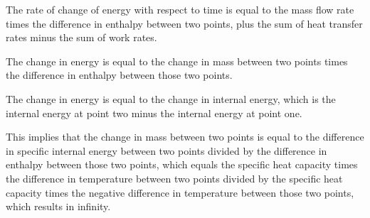 The rate of change of energy with respect to time is equal to the mass flow rate times the difference in enthalpy between two points, plus the sum of heat transfer rates minus the sum of work rates.

The change in energy is equal to the change in mass between two points times the difference in enthalpy between those two points.

The change in energy is equal to the change in internal energy, which is the internal energy at point two minus the internal energy at point one.

This implies that the change in mass between two points is equal to the difference in specific internal energy between two points divided by the difference in enthalpy between those two points, which equals the specific heat capacity times the difference in temperature between two points divided by the specific heat capacity times the negative difference in temperature between those two points, which results in infinity.